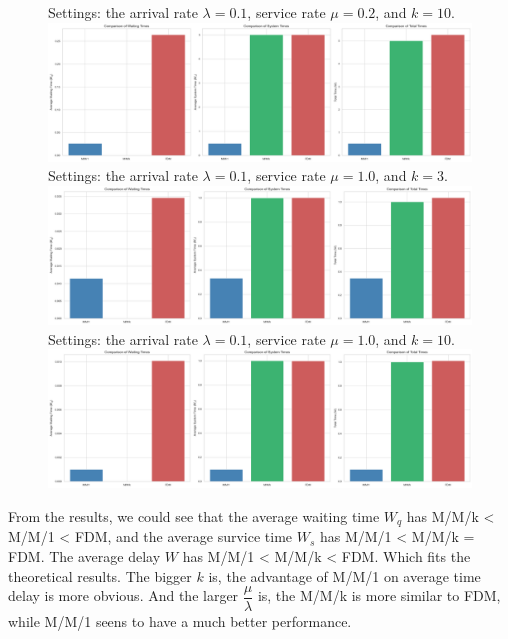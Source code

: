 \begin{homeworkProblem}
\begin{figure}[h]
    \centering
    Settings: the arrival rate $\lambda = 0.1$, service rate $\mu = 0.2$, and $k=10$.
    \includegraphics[width=\textwidth]{./figure/scenario4.png}
    Settings: the arrival rate $\lambda = 0.1$, service rate $\mu = 1.0$, and $k=3$.
    \includegraphics[width=\textwidth]{./figure/scenario5.png}
    Settings: the arrival rate $\lambda = 0.1$, service rate $\mu = 1.0$, and $k=10$.
    \includegraphics[width=\textwidth]{./figure/scenario6.png}
\end{figure}

From the results, we could see that the average waiting time $W_q$ has M/M/k < M/M/1 < FDM, and the average survice time $W_s$ has M/M/1 < M/M/k = FDM. The average delay $W$ has M/M/1 < M/M/k < FDM. Which fits the theoretical results. The bigger $k$ is, the advantage of M/M/1 on average time delay is more obvious. And the larger $\dfrac{\mu}{\lambda}$ is, the M/M/k is more similar to FDM, while M/M/1 seens to have a much better performance.

\end{homeworkProblem}

\newpage